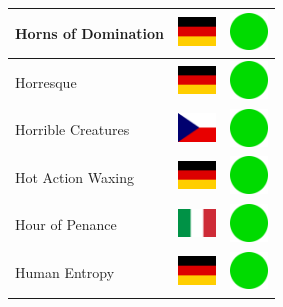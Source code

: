 \documentclass[12pt, a4paper, twoside]{report}
\begin{document}
\begin{center}
\begin{longtable}{|p{5cm}|p{2cm}|p{2cm}|}
 Horns of Domination                                        & \includegraphics[width=1cm]{../img/flags/de} &   \includegraphics[width=1cm]{../likes/y} \\ \hline
 Horresque                                                  & \includegraphics[width=1cm]{../img/flags/de} &   \includegraphics[width=1cm]{../likes/y} \\ \hline
 Horrible Creatures                                         & \includegraphics[width=1cm]{../img/flags/cz} &   \includegraphics[width=1cm]{../likes/y} \\ \hline
 Hot Action Waxing                                          & \includegraphics[width=1cm]{../img/flags/de} &   \includegraphics[width=1cm]{../likes/y} \\ \hline
 Hour of Penance                                            & \includegraphics[width=1cm]{../img/flags/it} &   \includegraphics[width=1cm]{../likes/y} \\ \hline
 Human Entropy                                              & \includegraphics[width=1cm]{../img/flags/de} &   \includegraphics[width=1cm]{../likes/y} \\ \hline

\end{longtable}
\end{center}
\end{document}
